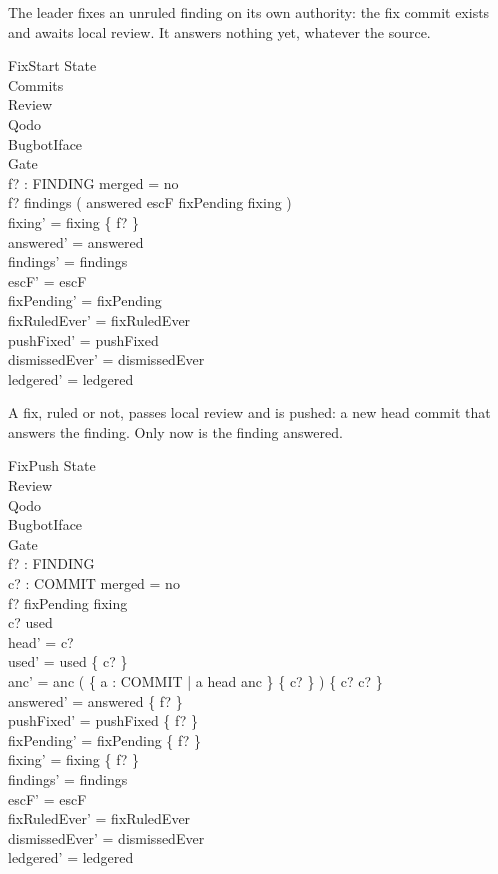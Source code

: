 \documentclass{article}
\begin{document}
The leader fixes an unruled finding on its own authority: the fix commit
exists and awaits local review. It answers nothing yet, whatever the source.

\begin{schema}{FixStart}
  \Delta State \\
  \Xi Commits \\
  \Xi Review \\
  \Xi Qodo \\
  \Xi BugbotIface \\
  \Xi Gate \\
  f? : FINDING
\where
  merged = no \\
  f? \in findings \setminus ( answered \cup escF \cup fixPending \cup fixing ) \\
  fixing' = fixing \cup \{ f? \} \\
  answered' = answered \\
  findings' = findings \\
  escF' = escF \\
  fixPending' = fixPending \\
  fixRuledEver' = fixRuledEver \\
  pushFixed' = pushFixed \\
  dismissedEver' = dismissedEver \\
  ledgered' = ledgered
\end{schema}

A fix, ruled or not, passes local review and is pushed: a new head commit that
answers the finding. Only now is the finding answered.

\begin{schema}{FixPush}
  \Delta State \\
  \Xi Review \\
  \Xi Qodo \\
  \Xi BugbotIface \\
  \Xi Gate \\
  f? : FINDING \\
  c? : COMMIT
\where
  merged = no \\
  f? \in fixPending \cup fixing \\
  c? \notin used \\
  head' = c? \\
  used' = used \cup \{ c? \} \\
  anc' = anc \cup ( \{ a : COMMIT | a \mapsto head \in anc \} \cross \{ c? \} ) \cup \{ c? \mapsto c? \} \\
  answered' = answered \cup \{ f? \} \\
  pushFixed' = pushFixed \cup \{ f? \} \\
  fixPending' = fixPending \setminus \{ f? \} \\
  fixing' = fixing \setminus \{ f? \} \\
  findings' = findings \\
  escF' = escF \\
  fixRuledEver' = fixRuledEver \\
  dismissedEver' = dismissedEver \\
  ledgered' = ledgered
\end{schema}
\end{document}

